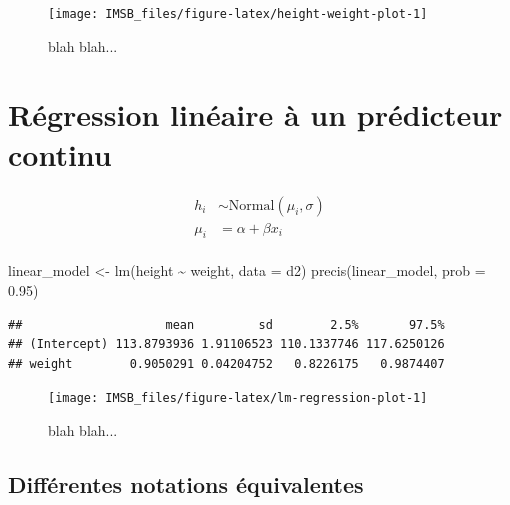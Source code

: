 \documentclass[
  a4paper,11pt,twoside,onecolumn,openright,final,oldfontcommands]{memoir}
\newenvironment{Shaded}{\begin{snugshade}}{\end{snugshade}}
\newcommand{\AttributeTok}[1]{\textcolor[rgb]{0.77,0.63,0.00}{#1}}
\newcommand{\FloatTok}[1]{\textcolor[rgb]{0.00,0.00,0.81}{#1}}
\newcommand{\FunctionTok}[1]{\textcolor[rgb]{0.00,0.00,0.00}{#1}}
\newcommand{\NormalTok}[1]{#1}
\newcommand{\OtherTok}[1]{\textcolor[rgb]{0.56,0.35,0.01}{#1}}
\newcommand{\SpecialCharTok}[1]{\textcolor[rgb]{0.00,0.00,0.00}{#1}}
\theoremstyle{definition}
\theoremstyle{definition}
\theoremstyle{definition}
\theoremstyle{definition}
\theoremstyle{remark}
\begin{document}
\begin{figure}[!htb]

{\centering \texttt{[image: IMSB\_files/figure-latex/height-weight-plot-1]} 

}

\caption{blah blah...}\label{fig:height-weight-plot}
\end{figure}

\hypertarget{ruxe9gression-linuxe9aire-uxe0-un-pruxe9dicteur-continu}{%
\section{Régression linéaire à un prédicteur continu}\label{ruxe9gression-linuxe9aire-uxe0-un-pruxe9dicteur-continu}}

\[
\begin{aligned}
h_{i} &\sim \mathrm{Normal}(\mu_{i}, \sigma) \\
\mu_{i} &= \alpha + \beta x_{i} \\
\end{aligned}
\]

\begin{Shaded}
\begin{Highlighting}[]
\NormalTok{linear\_model }\OtherTok{\textless{}{-}} \FunctionTok{lm}\NormalTok{(height }\SpecialCharTok{\textasciitilde{}}\NormalTok{ weight, }\AttributeTok{data =}\NormalTok{ d2)}
\FunctionTok{precis}\NormalTok{(linear\_model, }\AttributeTok{prob =} \FloatTok{0.95}\NormalTok{)}
\end{Highlighting}
\end{Shaded}

\begin{verbatim}
##                    mean         sd        2.5%       97.5%
## (Intercept) 113.8793936 1.91106523 110.1337746 117.6250126
## weight        0.9050291 0.04204752   0.8226175   0.9874407
\end{verbatim}

\begin{figure}[!htb]

{\centering \texttt{[image: IMSB\_files/figure-latex/lm-regression-plot-1]} 

}

\caption{blah blah...}\label{fig:lm-regression-plot}
\end{figure}

\hypertarget{diffuxe9rentes-notations-uxe9quivalentes}{%
\subsection{Différentes notations équivalentes}\label{diffuxe9rentes-notations-uxe9quivalentes}}
\end{document}
